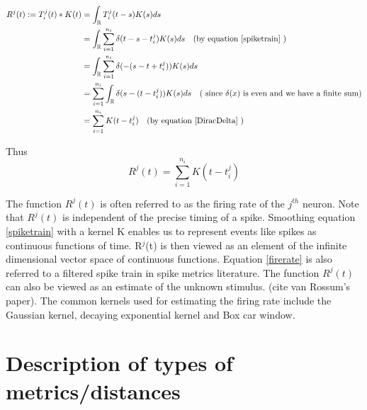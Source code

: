 \begin{align*}
\displaystyle
R^{j}(t) := T_{i}^{j}(t)*K(t) &= \int_{\mathbb{R}} T_{i}^{j}(t-s)K(s)  ds \\
& = \int_{\mathbb{R}}    \sum_{i=1}^{n_{i}} \delta(t - s -t_{i}^{j}) K(s)  ds 
\quad (\text{by equation \ref{spiketrain}  })  \\
& =  \int_{\mathbb{R}}    \sum_{i=1}^{n_{i}} \delta( -(s - t + t_{i}^{j})) K(s)  ds\\
& =  \sum_{i=1}^{n_{i}}   \int_{\mathbb{R}} \delta(s - (t - t_{i}^{j})) K(s)  ds \quad (\text{ since $\delta(x)$ is even and we have a finite sum})\\
& = \sum_{i=1}^{n_{i}} K(t-t^{j}_{i}) \quad (\text{by equation \ref{DiracDelta} })
\end{align*}

Thus
\begin{equation} \label{firerate}
R^{j}(t) = \sum_{i=1}^{n_{i}} K(t-t^{j}_{i})
\end{equation}


The function $R^{j}(t)$ is often referred to as the firing rate of the $j^{th}$ neuron. 
Note that $R^{j}(t)$ is independent of the precise timing of a spike.
Smoothing equation \eqref{spiketrain} with a kernel K enables us to represent events like spikes as continuous functions of time. R$^{j}$(t) is then viewed as an element of the infinite dimensional vector space of continuous functions.  Equation \eqref{firerate} 
is also referred to a filtered spike train in spike metrics literature.
The function $R^{j}(t)$ can also be viewed as an estimate of the unknown stimulus.
(cite van Rossum's paper). 
The common kernels used for estimating the firing rate include the Gaussian kernel,  decaying exponential kernel and Box car window.



\section{Description of types of metrics/distances}














